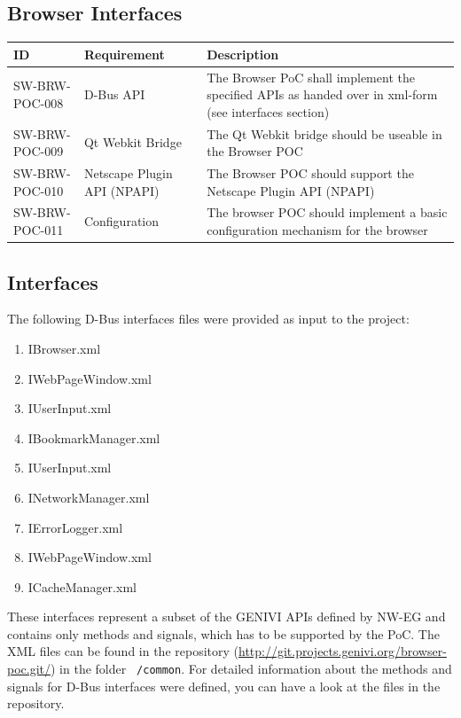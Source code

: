 \documentclass{pelagicore}
\begin{document}
\subsection{Browser Interfaces}
\begin{tabularx}{\textwidth}{|p{4em} | p{6.5em} | X |}
    \hline
    \rowcolor{blue}
    \bf ID & \bf Requirement & \bf Description \\
    \hline
    SW-BRW-POC-008 & D-Bus API & The Browser PoC shall implement the specified
                                 APIs as handed over in xml-form (see
                                 interfaces section)\\
    \hline
    SW-BRW-POC-009 & Qt Webkit Bridge & The Qt Webkit bridge should be useable
                                        in the Browser POC \\
    \hline
    SW-BRW-POC-010 & Netscape Plugin API (NPAPI) &
        The Browser POC should support the Netscape Plugin API (NPAPI) \\
    \hline
    SW-BRW-POC-011 & Configuration & The browser POC should implement a basic
                                     configuration mechanism for the browser\\
    \hline
\end{tabularx}

\subsection{Interfaces}
The following D-Bus interfaces files were provided as input to the project:

\begin{enumerate}
    \item IBrowser.xml
    \item IWebPageWindow.xml
    \item IUserInput.xml
    \item IBookmarkManager.xml
    \item IUserInput.xml
    \item INetworkManager.xml
    \item IErrorLogger.xml
    \item IWebPageWindow.xml
    \item ICacheManager.xml
\end{enumerate}

These interfaces represent a subset of the GENIVI APIs defined by NW-EG and
contains only methods and signals, which has to be supported by the PoC. The
XML files can be found in the repository
(\url{http://git.projects.genivi.org/browser-poc.git/}) in the folder {\tt
/common}. For detailed information about the methods and signals for D-Bus
interfaces were defined, you can have a look at the files in the repository.
\end{document}
